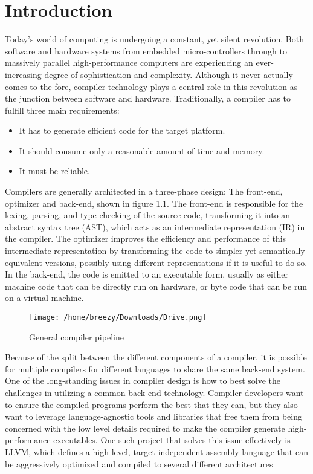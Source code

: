 \documentclass[openany]{book}
\begin{document}
\tableofcontents

\listoffigures

\listoftables

\chapter{Introduction}
   \Large
   Today's world of computing is undergoing a constant, yet silent revolution. Both
   software and hardware systems from embedded micro-controllers through to massively
   parallel high-performance computers are experiencing an ever-increasing degree of
   sophistication and complexity. Although it never actually comes to the fore, compiler
   technology plays a central role in this revolution as the junction between software and
   hardware. Traditionally, a compiler has to fulfill three main requirements:
   \begin{itemize}
   	\item It has to generate efficient code for the target platform.
   	\item It should consume only a reasonable amount of time and memory.
   	\item It must be reliable.
   \end{itemize}

Compilers are generally architected in a three-phase design: The front-end, optimizer
and back-end, shown in figure 1.1. The front-end is responsible for the lexing, parsing, and
type checking of the source code, transforming it into an abstract syntax tree (AST), which
acts as an intermediate representation (IR) in the compiler. The optimizer improves the
efficiency and performance of this intermediate representation by transforming the code to
simpler yet semantically equivalent versions, possibly using different representations if it
is useful to do so. In the back-end, the code is emitted to an executable form, usually as
either machine code that can be directly run on hardware, or byte code that can be run on a
virtual machine.\linebreak \linebreak 
\begin{figure}
	\texttt{[image: /home/breezy/Downloads/Drive.png]}
	\caption{General compiler pipeline}
	\label{fig:1.1}
\end{figure} Because of the split between the different components of a compiler, it is possible for
multiple compilers for different languages to share the same back-end system. One of the
long-standing issues in compiler design is how to best solve the challenges in utilizing a
common back-end technology. Compiler developers want to ensure the compiled programs
perform the best that they can, but they also want to leverage language-agnostic tools and
libraries that free them from being concerned with the low level details required to make the compiler generate high-performance executables.  One such project that solves this issue
effectively is LLVM, which defines a high-level, target independent assembly language
that can be aggressively optimized and compiled to several different architectures 
\end{document}
